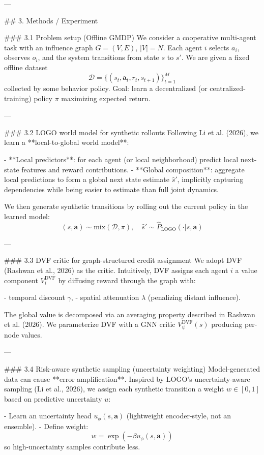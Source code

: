 ---

## 3. Methods / Experiment  

### 3.1 Problem setup (Offline GMDP)  
We consider a cooperative multi-agent task with an influence graph \(G=(V,E)\), \(|V|=N\). Each agent \(i\) selects \(a_i\), observes \(o_i\), and the system transitions from state \(s\) to \(s'\). We are given a fixed offline dataset  
\[
\mathcal{D}=\{(s_t, \mathbf{a}_t, r_t, s_{t+1})\}_{t=1}^{M}
\]
collected by some behavior policy. Goal: learn a decentralized (or centralized-training) policy \(\pi\) maximizing expected return.

---

### 3.2 LOGO world model for synthetic rollouts  
Following Li et al. (2026), we learn a **local-to-global world model**:

- **Local predictors**: for each agent (or local neighborhood) predict local next-state features and reward contributions.  
- **Global composition**: aggregate local predictions to form a global next state estimate \(\hat{s}'\), implicitly capturing dependencies while being easier to estimate than full joint dynamics.

We then generate synthetic transitions by rolling out the current policy in the learned model:
\[
(s, \mathbf{a}) \sim \text{mix}(\mathcal{D}, \pi), \quad \hat{s}' \sim \hat{P}_{\text{LOGO}}(\cdot|s,\mathbf{a})
\]

---

### 3.3 DVF critic for graph-structured credit assignment  
We adopt DVF (Rashwan et al., 2026) as the critic. Intuitively, DVF assigns each agent \(i\) a value component \(V_i^{\text{DVF}}\) by diffusing reward through the graph with:

- temporal discount \(\gamma\),  
- spatial attenuation \(\lambda\) (penalizing distant influence).

The global value is decomposed via an averaging property described in Rashwan et al. (2026). We parameterize DVF with a GNN critic \(V_\psi^{\text{DVF}}(s)\) producing per-node values.

---

### 3.4 Risk-aware synthetic sampling (uncertainty weighting)  
Model-generated data can cause **error amplification**. Inspired by LOGO’s uncertainty-aware sampling (Li et al., 2026), we assign each synthetic transition a weight \(w \in [0,1]\) based on predictive uncertainty \(u\):

- Learn an uncertainty head \(u_\phi(s,\mathbf{a})\) (lightweight encoder-style, not an ensemble).  
- Define weight:
\[
w = \exp(-\beta u_\phi(s,\mathbf{a}))
\]
so high-uncertainty samples contribute less.

